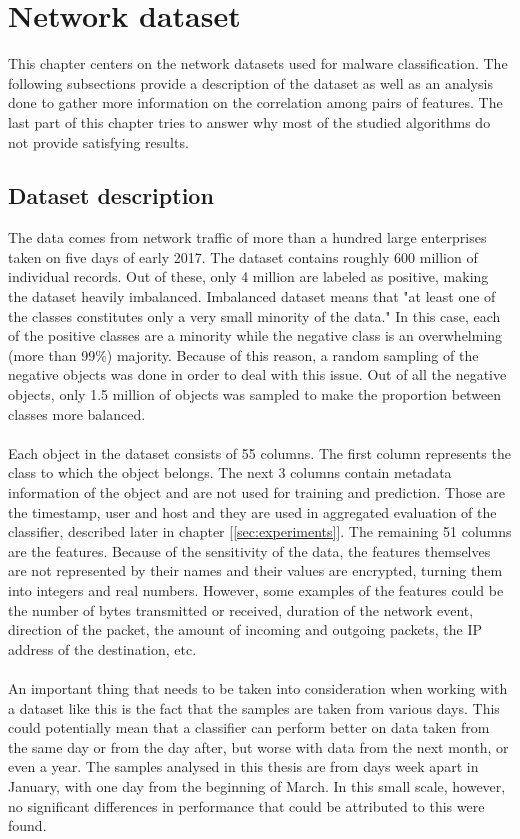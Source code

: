 \documentclass[11pt]{article}
\begin{document}
  \section{Network dataset}
    \label{sec:datadesc}
    This chapter centers on the network datasets used for malware classification. The following subsections provide a description of the dataset as well as an analysis done to gather more information on the correlation among pairs of features. The last part of this chapter tries to answer why most of the studied algorithms do not provide satisfying results.
    \subsection{Dataset description}
      The data comes from network traffic of more than a hundred large enterprises taken on five days of early 2017. The dataset contains roughly 600 million of individual records. Out of these, only 4 million are labeled as positive, making the dataset heavily imbalanced. Imbalanced dataset means that "at least one of the classes constitutes only a very small minority of the data."\cite{imbalanced} In this case, each of the positive classes are a minority while the negative class is an overwhelming (more than 99\%) majority. Because of this reason, a random sampling of the negative objects was done in order to deal with this issue. Out of all the negative objects, only 1.5 million of objects was sampled to make the proportion between classes more balanced.
      \\~\\
      Each object in the dataset consists of 55 columns. The first column represents the class to which the object belongs. The next 3 columns contain metadata information of the object and are not used for training and prediction. Those are the timestamp, user and host and they are used in aggregated evaluation of the classifier, described later in chapter [\ref{sec:experiments}]. The remaining 51 columns are the features. Because of the sensitivity of the data, the features themselves are not represented by their names and their values are encrypted, turning them into integers and real numbers. However, some examples of the features could be the number of bytes transmitted or received, duration of the network event, direction of the packet, the amount of incoming and outgoing packets, the IP address of the destination, etc.
      \\~\\
      An important thing that needs to be taken into consideration when working with a dataset like this is the fact that the samples are taken from various days. This could potentially mean that a classifier can perform better on data taken from the same day or from the day after, but worse with data from the next month, or even a year. The samples analysed in this thesis are from days week apart in January, with one day from the beginning of March. In this small scale, however, no significant differences in performance that could be attributed to this were found.
\end{document}
